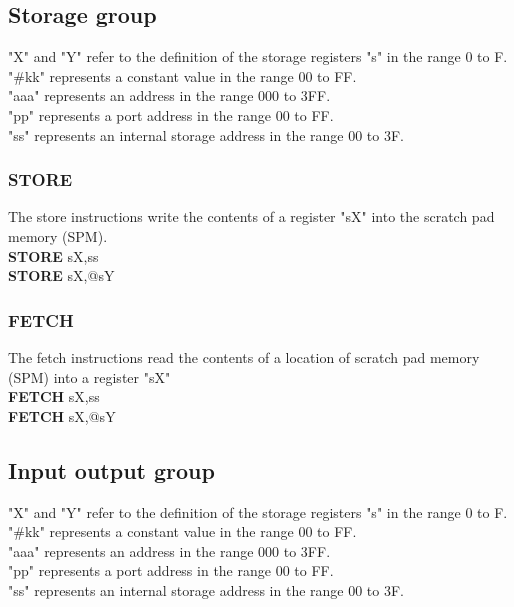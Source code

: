         \subsection{Storage group}
            "X" and "Y" refer to the definition of the storage registers "s" in the range 0 to F.\\
            "\#kk" represents a constant value in the range 00 to FF.\\
            "aaa" represents an address in the range 000 to 3FF.\\
            "pp" represents a port address in the range 00 to FF.\\
            "ss" represents an internal storage address in the range 00 to 3F.\\
        \subsubsection{STORE}
            The store instructions write the contents of a register "sX" into the scratch pad memory (SPM).\\
                \textbf{STORE} sX,ss\\
                \textbf{STORE} sX,@sY\\

        \subsubsection{FETCH}
            The fetch instructions read the contents of a location of scratch pad memory (SPM) into a register "sX"\\
                \textbf{FETCH} sX,ss\\
                \textbf{FETCH} sX,@sY\\

        \subsection{Input output group}
            "X" and "Y" refer to the definition of the storage registers "s" in the range 0 to F.\\
            "\#kk" represents a constant value in the range 00 to FF.\\
            "aaa" represents an address in the range 000 to 3FF.\\
            "pp" represents a port address in the range 00 to FF.\\
            "ss" represents an internal storage address in the range 00 to 3F.\\
